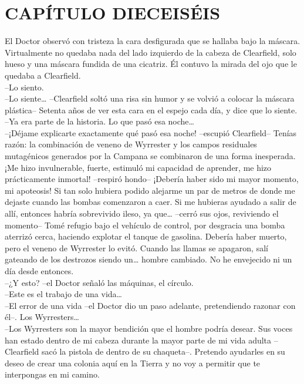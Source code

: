 \chapter*{CAPÍTULO DIECEISÉIS}
El Doctor observó con tristeza la cara desfigurada que se hallaba bajo
la máscara. Virtualmente no quedaba nada del lado izquierdo de la cabeza
de Clearfield, solo hueso y una máscara fundida de una cicatriz. Él
contuvo la mirada del ojo que le quedaba a Clearfield.\\
--Lo siento.\\
--Lo siente\ldots{} --Clearfield soltó una risa sin humor y se volvió a
colocar la máscara plástica-- Setenta años de ver esta cara en el espejo
cada día, y dice que lo siente.\\
--Ya era parte de la historia. Lo que pasó esa noche\ldots{}\\
--¡Déjame explicarte exactamente qué pasó esa noche! --escupió
Clearfield-- Tenías razón: la combinación de veneno de Wyrrester y los
campos residuales mutagénicos generados por la Campana se combinaron de
una forma inesperada. ¡Me hizo invulnerable, fuerte, estimuló mi
capacidad de aprender, me hizo prácticamente inmortal! --respiró hondo--
¡Debería haber sido mi mayor momento, mi apoteosis! Si tan solo hubiera
podido alejarme un par de metros de donde me dejaste cuando las bombas
comenzaron a caer. Si me hubieras ayudado a salir de allí, entonces
habría sobrevivido ileso, ya que\ldots{} --cerró sus ojos, reviviendo el
momento-- Tomé refugio bajo el vehículo de control, por desgracia una
bomba aterrizó cerca, haciendo explotar el tanque de gasolina. Debería
haber muerto, pero el veneno de Wyrrester lo evitó. Cuando las llamas se
apagaron, salí gateando de los destrozos siendo un\ldots{} hombre
cambiado. No he envejecido ni un día desde entonces.\\
--¿Y esto? --el Doctor señaló las máquinas, el círculo.\\
--Este es el trabajo de una vida\ldots{}\\
--El error de una vida --el Doctor dio un paso adelante, pretendiendo
razonar con él--. Los Wyrresters\ldots{}\\
--Los Wyrresters son la mayor bendición que el hombre podría desear. Sus
voces han estado dentro de mi cabeza durante la mayor parte de mi vida
adulta --Clearfield sacó la pistola de dentro de su chaqueta--. Pretendo
ayudarles en su deseo de crear una colonia aquí en la Tierra y no voy a
permitir que te interpongas en mi camino.\\
